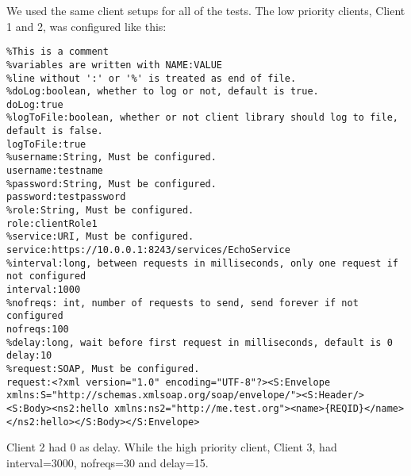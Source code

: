     We used the same client setups for all of the tests. The low priority clients, Client 1 and 2, was configured like this:
\lstset{language=matlab}
\begin{lstlisting}
%This is a comment
%variables are written with NAME:VALUE
%line without ':' or '%' is treated as end of file.
%doLog:boolean, whether to log or not, default is true.
doLog:true
%logToFile:boolean, whether or not client library should log to file, default is false.
logToFile:true
%username:String, Must be configured.
username:testname
%password:String, Must be configured.
password:testpassword
%role:String, Must be configured.
role:clientRole1
%service:URI, Must be configured.
service:https://10.0.0.1:8243/services/EchoService
%interval:long, between requests in milliseconds, only one request if not configured
interval:1000
%nofreqs: int, number of requests to send, send forever if not configured
nofreqs:100
%delay:long, wait before first request in milliseconds, default is 0
delay:10
%request:SOAP, Must be configured.
request:<?xml version="1.0" encoding="UTF-8"?><S:Envelope xmlns:S="http://schemas.xmlsoap.org/soap/envelope/"><S:Header/><S:Body><ns2:hello xmlns:ns2="http://me.test.org"><name>{REQID}</name></ns2:hello></S:Body></S:Envelope>
\end{lstlisting}
    Client 2 had 0 as delay. While the high priority client, Client 3, had interval=3000, nofreqs=30 and delay=15.
